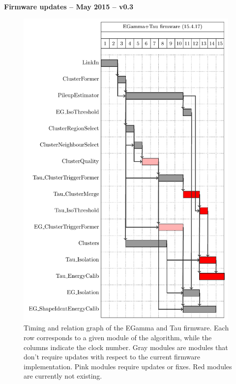 \documentclass[a4paper, 12pt]{article}
\begin{document}
\renewcommand{\contentsname}{}


\vspace*{1cm}
\begin{center}
{\LARGE \bf Firmware updates -- May 2015 -- v0.3}\\
\vspace*{0.1cm}
\end{center}
\vspace*{1cm}


\begin{figure}[hbtp]
  \begin{center}
    \includegraphics[width=11cm]{./gantt_charts/firmware_egAndTau_mod.pdf}
    \caption{Timing and relation graph of the EGamma and Tau firmware. Each row corresponds to a given module of the algorithm, while the columns indicate the clock number. Gray modules are modules that don't require updates with respect to the current firmware implementation. Pink modules require updates or fixes. Red modules are currently not existing.}
    \label{fig:gantt}
  \end{center}
\end{figure}
\end{document}
